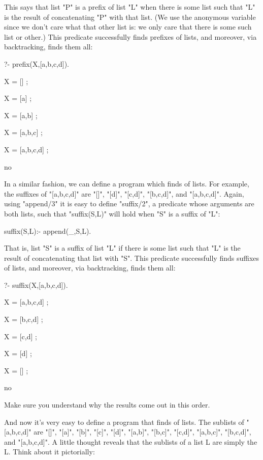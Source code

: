 This says that list "P" is a prefix of list "L" when there
is some list such that "L" is the result of concatenating
"P" with that list.  (We use the anonymous variable since we
don't care what that other list is: we only care that there is some such
list or other.) This predicate successfully finds prefixes of lists,
and moreover, via backtracking, finds them all:
\begin{LPNcodedisplay}
?- prefix(X,[a,b,c,d]).

X = [] ;

X = [a] ;

X = [a,b] ;

X = [a,b,c] ;

X = [a,b,c,d] ;

no
\end{LPNcodedisplay}


In a similar fashion, we can define a program which finds
 of lists.  For example, the suffixes of
"[a,b,c,d]" are "[]", "[d]", "[c,d]",
"[b,c,d]", and "[a,b,c,d]".  Again, using "append/3" it
is easy to define "suffix/2", a predicate whose arguments
are both lists, such that "suffix(S,L)" will hold when "S"
is a suffix of "L":
\begin{LPNcodedisplay}
suffix(S,L):- append(_,S,L).
\end{LPNcodedisplay}
That is, list "S" is a suffix of list "L" if there is some
list such that "L" is the result of concatenating that list with
"S".  This predicate successfully finds suffixes of lists, and
moreover, via backtracking, finds them all:
\begin{LPNcodedisplay}
?- suffix(X,[a,b,c,d]).

X = [a,b,c,d] ;

X = [b,c,d] ;

X = [c,d] ;

X = [d] ;

X = [] ;

no
\end{LPNcodedisplay}

Make sure you understand why the results come out in this order.

\bigskip

And now it's very easy to define a program that finds
 of lists.  The sublists of "[a,b,c,d]" are "[]",
"[a]", "[b]", "[c]", "[d]", "[a,b]",
"[b,c]", "[c,d]", "[a,b,c]",
"[b,c,d]", and "[a,b,c,d]".  A little thought reveals
that the sublists of a list L are simply the  L. Think about it pictorially:


